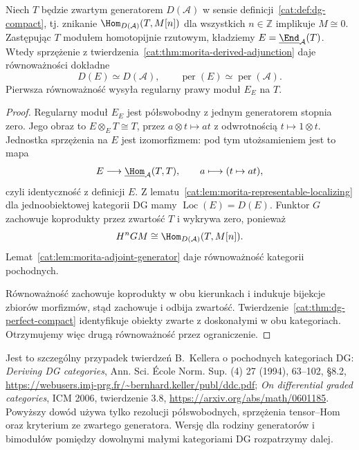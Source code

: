 \begin{twierdzenie}\label{cat:thm:morita-compact-generator}
Niech $T$ będzie zwartym generatorem $D(\mathcal A)$ w sensie definicji~\ref{cat:def:dg-compact}, tj. znikanie $\Hom_{D(\mathcal A)}(T,M[n])$ dla wszystkich $n\in\mathbb Z$ implikuje $M\cong0$. Zastępując $T$ modułem homotopijnie rzutowym, kładziemy $E=\underline{\End}_{\mathcal A}(T)$. Wtedy sprzężenie z twierdzenia~\ref{cat:thm:morita-derived-adjunction} daje równoważności dokładne
\[
 D(E)\simeq D(\mathcal A),\qquad
 \operatorname{per}(E)\simeq\operatorname{per}(\mathcal A).
\]
Pierwsza równoważność wysyła regularny prawy moduł $E_E$ na $T$.
\end{twierdzenie}
\begin{proof}
Regularny moduł $E_E$ jest półswobodny z jednym generatorem stopnia zero. Jego obraz to $E\otimes_E T\cong T$, przez $a\otimes t\mapsto at$ z odwrotnością $t\mapsto1\otimes t$. Jednostka sprzężenia na $E$ jest izomorfizmem: pod tym utożsamieniem jest to mapa
\[
 E\longrightarrow\underline{\Hom}_{\mathcal A}(T,T),\qquad
 a\longmapsto(t\mapsto at),
\]
czyli identyczność z definicji $E$. Z lematu~\ref{cat:lem:morita-representable-localizing} dla jednoobiektowej kategorii DG mamy $\operatorname{Loc}(E)=D(E)$. Funktor $G$ zachowuje koprodukty przez zwartość $T$ i wykrywa zero, ponieważ
\[
 H^nG M\cong\Hom_{D(\mathcal A)}(T,M[n]).
\]
Lemat~\ref{cat:lem:morita-adjoint-generator} daje równoważność kategorii pochodnych.

Równoważność zachowuje koprodukty w obu kierunkach i indukuje bijekcje zbiorów morfizmów, stąd zachowuje i odbija zwartość. Twierdzenie~\ref{cat:thm:dg-perfect-compact} identyfikuje obiekty zwarte z doskonałymi w obu kategoriach. Otrzymujemy więc drugą równoważność przez ograniczenie.
\end{proof}

Jest to szczególny przypadek twierdzeń B.~Kellera o pochodnych kategoriach DG: \emph{Deriving DG categories}, Ann. Sci. École Norm. Sup. (4) 27 (1994), 63--102, \S8.2, \url{https://webusers.imj-prg.fr/~bernhard.keller/publ/ddc.pdf}; \emph{On differential graded categories}, ICM 2006, twierdzenie 3.8, \url{https://arxiv.org/abs/math/0601185}. Powyższy dowód używa tylko rezolucji półswobodnych, sprzężenia tensor--Hom oraz kryterium ze zwartego generatora. Wersję dla rodziny generatorów i bimodułów pomiędzy dowolnymi małymi kategoriami DG rozpatrzymy dalej.

